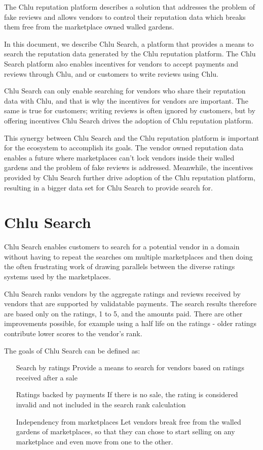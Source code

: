 \documentclass[a4paper]{article}
\begin{document}
The Chlu reputation platform\cite{chlu-reputation} describes a
solution that addresses the problem of fake reviews and allows vendors
to control their reputation data which breaks them free from the
marketplace owned walled gardens.

In this document, we describe Chlu Search, a platform that provides a
means to search the reputation data generated by the Chlu reputation
platform. The Chlu Search platform also enables incentives for vendors
to accept payments and reviews through Chlu, and or customers to write
reviews using Chlu.

Chlu Search can only enable searching for vendors who share their
reputation data with Chlu, and that is why the incentives for vendors
are important. The same is true for customers; writing reviews is
often ignored by customers, but by offering incentives Chlu Search
drives the adoption of Chlu reputation platform.

This synergy between Chlu Search and the Chlu reputation platform is
important for the ecosystem to accomplish its goals. The vendor owned
reputation data enables a future where marketplaces can't lock vendors
inside their walled gardens and the problem of fake reviews is
addressed. Meanwhile, the incentives provided by Chlu Search further
drive adoption of the Chlu reputation platform, resulting in a bigger
data set for Chlu Search to provide search for.

\section{Chlu Search}

Chlu Search enables customers to search for a potential vendor in a
domain without having to repeat the searches om multiple marketplaces
and then doing the often frustrating work of drawing parallels between
the diverse ratings systems used by the marketplaces.

Chlu Search ranks vendors by the aggregate ratings and reviews
received by vendors that are supported by validatable payments. The
search results therefore are based only on the ratings, 1 to 5, and
the amounts paid. There are other improvements possible, for example
using a half life on the ratings - older ratings contribute lower
scores to the vendor's rank.

The goals of Chlu Search can be defined as:

\begin{enumerate}
\item[Search by ratings] Provide a means to search for vendors based
  on ratings received after a sale
\item[Ratings backed by payments] If there is no sale, the rating is
  considered invalid and not included in the search rank calculation
\item[Independency from marketplaces] Let vendors break free from the
  walled gardens of marketplaces, so that they can chose to start
  selling on any marketplace and even move from one to the other.
\end{enumerate}
\end{document}
